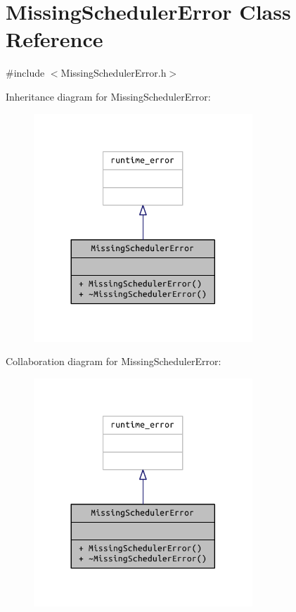 \hypertarget{class_missing_scheduler_error}{}\section{Missing\+Scheduler\+Error Class Reference}
\label{class_missing_scheduler_error}


{\ttfamily \#include $<$Missing\+Scheduler\+Error.\+h$>$}



Inheritance diagram for Missing\+Scheduler\+Error\+:
\nopagebreak
\begin{figure}[H]
\begin{center}
\leavevmode
\includegraphics[width=233pt]{class_missing_scheduler_error__inherit__graph}
\end{center}
\end{figure}


Collaboration diagram for Missing\+Scheduler\+Error\+:
\nopagebreak
\begin{figure}[H]
\begin{center}
\leavevmode
\includegraphics[width=233pt]{class_missing_scheduler_error__coll__graph}
\end{center}
\end{figure}
